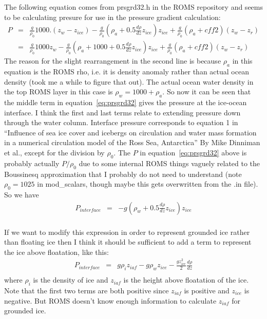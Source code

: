 \documentclass[12pt]{article}
\begin{document}
The following equation comes from prsgrd32.h in the ROMS repository and seems to be calculating presure for use in the pressure gradient calculation:
\begin{eqnarray}
\nonumber P & = & \frac{g}{\rho_0}1000.(z_w-z_{ice})- \frac{g}{\rho_0}(\rho_a+0.5\frac{d\rho}{dz}z_{ice})z_{ice}+\frac{g}{\rho_0}(\rho_a+{cff2})(z_w-z_r) \\
            & = & \frac{g}{\rho_0}1000z_w - \frac{g}{\rho_0}(\rho_a+1000+0.5\frac{d\rho}{dz}z_{ice})z_{ice}+\frac{g}{\rho_0}(\rho_a+{cff2})(z_w-z_r) 
\label{eq:prsgrd32} 
\end{eqnarray}
The reason for the slight rearrangement in the second line is because $\rho_a$ in this equation is the ROMS rho, i.e. it is density anomaly rather than 
actual ocean density (took me a while to figure that out).  
The actual ocean water density in the top ROMS layer in this case is $\rho_w = 1000 + \rho_a$.  
So now it can be seen that the middle term in equation~\ref{eq:prsgrd32} gives the pressure at the ice-ocean interface.
I think the first and last terms relate to extending 
pressure down through the water column.  Interface pressure corresponds to equation 1 in 
``Influence of sea ice cover and icebergs
on circulation and water mass formation in a
numerical circulation model of the Ross Sea,
Antarctica''
By Mike Dinniman et al., except for the division by $\rho_0$. The $P$ in equation~\ref{eq:prsgrd32} above is probably actually 
$P/\rho_0$ due to some internal ROMS things vaguely related to the Boussinesq approximation that I probably do not need to understand 
(note $\rho_0=1025$ in mod\_scalars, though maybe this gets overwritten from the .in file).
So we have 
\begin{eqnarray}
 P_{interface} & = & - {g}(\rho_w+0.5\frac{d\rho}{dz}z_{ice})z_{ice}  \label{eq:DinniPress} \\ 
\nonumber 
\end{eqnarray}

If we want to modify this expression in order to represent grounded ice rather than floating ice then I think 
it should be sufficient to add a term to represent the ice above floatation,  like this:
\begin{eqnarray}
\nonumber P_{interface} & = &  {g \rho_i z_{iaf}} - {g \rho_w z_{ice}} - \frac{g z_{ice}^2}{2} \frac{d\rho}{dz} \\
\nonumber 
\end{eqnarray}
where $\rho_i$ is the density of ice and $z_{iaf}$ is the height above floatation of the ice. 
Note that the first two terms are both positive since $z_{iaf}$ is positive and $z_{ice}$ is 
negative. But ROMS doesn't know enough information to calculate $z_{iaf}$ for grounded ice. 
\end{document}
